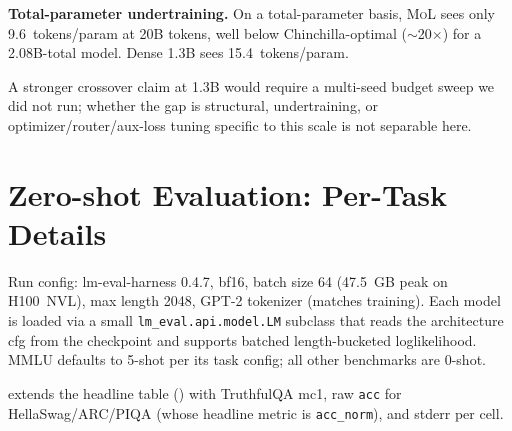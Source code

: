 \documentclass[10pt]{article}
\newcommand{\mol}{\textsc{MoL}}
\begin{document}
\textbf{Total-parameter undertraining.} On a total-parameter basis, \mol{} sees only 9.6~tokens/param at 20B tokens, well below Chinchilla-optimal ($\sim$20$\times$) for a 2.08B-total model. Dense 1.3B sees 15.4~tokens/param.

A stronger crossover claim at 1.3B would require a multi-seed budget sweep we did not run; whether the gap is structural, undertraining, or optimizer/router/aux-loss tuning specific to this scale is not separable here.

\section{Zero-shot Evaluation: Per-Task Details}
\label{app:zeroshot}

Run config: lm-eval-harness 0.4.7, bf16, batch size 64 (47.5~GB peak on H100~NVL), max length 2048, GPT-2 tokenizer (matches training). Each model is loaded via a small \texttt{lm\_eval.api.model.LM} subclass that reads the architecture cfg from the checkpoint and supports batched length-bucketed loglikelihood. MMLU defaults to 5-shot per its task config; all other benchmarks are 0-shot.

 extends the headline table () with TruthfulQA mc1, raw \texttt{acc} for HellaSwag/ARC/PIQA (whose headline metric is \texttt{acc\_norm}), and stderr per cell.
\end{document}
